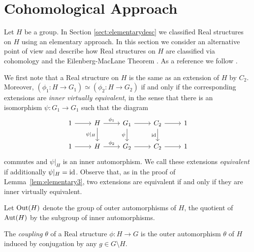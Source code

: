 \section{Cohomological Approach}
Let $H$ be a group. In Section \ref{sect:elementarydesc} we classified Real structures on $H$ using an elementary approach. In this section we consider an alternative point of view and describe how Real structures on $H$ are classified via cohomology and the Eilenberg-MacLane Theorem \cite{EML}. As a reference we follow \cite[\S 1]{DJR}.

We first note that a Real structure on $H$ is the same as an extension of $H$ by $C_2$.
Moreover, $(\phi_1 \colon H \rightarrow {G}_1) \simeq (\phi_2 \colon H \rightarrow {G}_2)$
if and only if the corresponding extensions are \emph{inner virtually equivalent},
in the sense that there is an isomorphism $\psi \colon {G}_1 \rightarrow {G}_1$ such that the diagram
\[\begin{tikzcd}
	1 & H & {{G}_1} & {C_2} & 1 \\
	1 & H & {{G}_2} & {C_2} & 1
	\arrow[from=1-1, to=1-2]
	\arrow["{\phi_1}", from=1-2, to=1-3]
	\arrow["\psi|_H"', from=1-2, to=2-2]
	\arrow[from=1-3, to=1-4]
	\arrow["\psi"', from=1-3, to=2-3]
	\arrow[from=1-4, to=1-5]
	\arrow["\id"', from=1-4, to=2-4]
	\arrow[from=2-1, to=2-2]
	\arrow["{\phi_2}", from=2-2, to=2-3]
	\arrow[from=2-3, to=2-4]
	\arrow[from=2-4, to=2-5]
\end{tikzcd}\]
commutes and $\psi|_H$ is an inner automorphism. We call these extensions {\em equivalent} if additionally $\psi|_H=\operatorname{id}$. Observe that, as in the proof of Lemma~\ref{lem:elementary3}, two extensions are equivalent if and only if they are inner virtually equivalent.

Let $\operatorname{Out} (H)$ denote the group of outer automorphisms of $H$, the quotient of $\operatorname{Aut}(H)$ by the subgroup of inner automorphisms.

\begin{defn}
  The \emph{coupling} $\theta$ of a Real structure $\phi \colon H \rightarrow {G}$ is the outer automorphism $\theta$ of $H$
  induced by conjugation by any $g\in G\setminus H$.
\end{defn}

